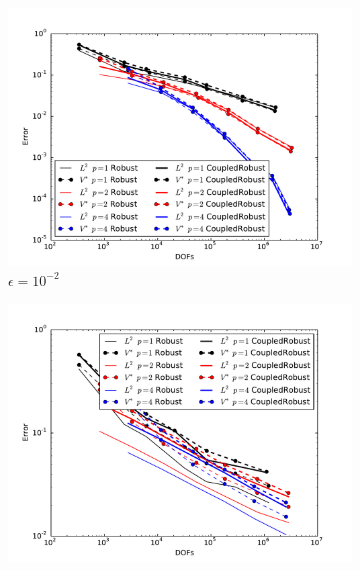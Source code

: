 \documentclass{article}
\theoremstyle{definition}
\theoremstyle{remark}
\begin{document}

\begin{figure}[ht]
\centering
\begin{subfigure}[t]{0.45\textwidth}
\centering
\includegraphics[width=\textwidth]{Confusion/Robustness/convergence_epsilon=1e-2.pdf}
\caption{$\epsilon=10^{-2}$}
\end{subfigure}
\begin{subfigure}[t]{0.45\textwidth}
\centering
\includegraphics[width=\textwidth]{Confusion/Robustness/convergence_epsilon=1e-4.pdf}

\end{subfigure}
\end{figure}
\end{document}
